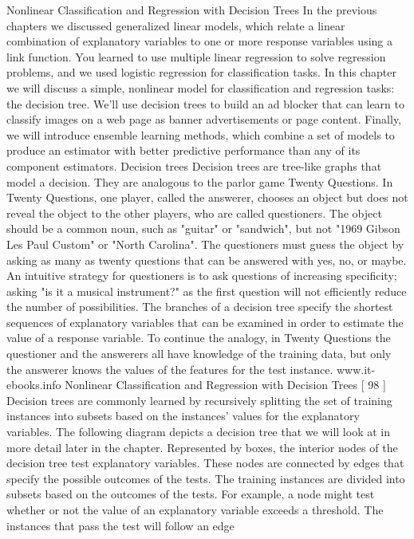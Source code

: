 Nonlinear Classification
and Regression with
Decision Trees
In the previous chapters we discussed generalized linear models, which relate a
linear combination of explanatory variables to one or more response variables using
a link function. You learned to use multiple linear regression to solve regression
problems, and we used logistic regression for classification tasks. In this chapter we
will discuss a simple, nonlinear model for classification and regression tasks: the
decision tree. We'll use decision trees to build an ad blocker that can learn to classify
images on a web page as banner advertisements or page content. Finally, we will
introduce ensemble learning methods, which combine a set of models to produce an
estimator with better predictive performance than any of its component estimators.
Decision trees
Decision trees are tree-like graphs that model a decision. They are analogous to the
parlor game Twenty Questions. In Twenty Questions, one player, called the answerer,
chooses an object but does not reveal the object to the other players, who are called
questioners. The object should be a common noun, such as "guitar" or "sandwich", but
not "1969 Gibson Les Paul Custom" or "North Carolina". The questioners must guess
the object by asking as many as twenty questions that can be answered with yes, no, or
maybe. An intuitive strategy for questioners is to ask questions of increasing specificity;
asking "is it a musical instrument?" as the first question will not efficiently reduce the
number of possibilities. The branches of a decision tree specify the shortest sequences
of explanatory variables that can be examined in order to estimate the value of a
response variable. To continue the analogy, in Twenty Questions the questioner and
the answerers all have knowledge of the training data, but only the answerer knows
the values of the features for the test instance.
www.it-ebooks.info
Nonlinear Classification and Regression with Decision Trees
[ 98 ]
Decision trees are commonly learned by recursively splitting the set of training
instances into subsets based on the instances' values for the explanatory variables.
The following diagram depicts a decision tree that we will look at in more detail
later in the chapter.
Represented by boxes, the interior nodes of the decision tree test explanatory
variables. These nodes are connected by edges that specify the possible outcomes of
the tests. The training instances are divided into subsets based on the outcomes of
the tests. For example, a node might test whether or not the value of an explanatory
variable exceeds a threshold. The instances that pass the test will follow an edge
